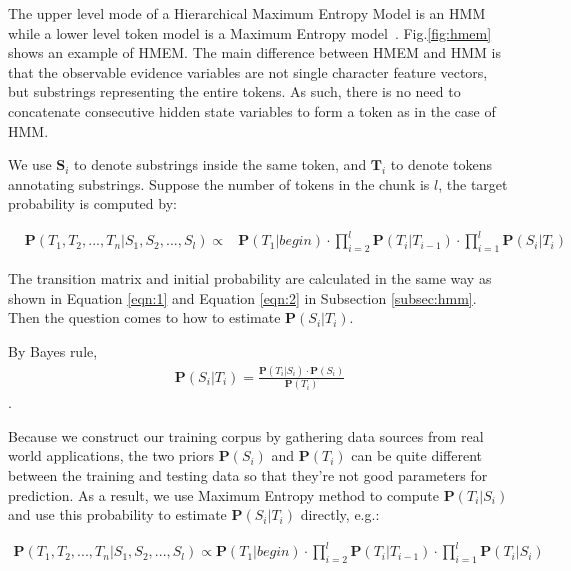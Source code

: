 The upper level mode of a Hierarchical Maximum Entropy Model 
is an HMM while a lower level token model 
is a Maximum Entropy model~\cite{Berger96:ME}\cite{megaweb}.
Fig.\ref{fig:hmem} shows an example of HMEM.
The main difference between HMEM and HMM is
that the observable evidence variables are not single character feature vectors, 
but substrings representing the entire tokens.
As such, there is no need to concatenate consecutive hidden state
variables to form a token as in the case of HMM.

We use $\mathbf{S}_i$ to denote substrings
inside the same token, and $\mathbf{T}_i$ to denote tokens annotating
substrings. Suppose the number of tokens in the chunk is $l$, the
target probability is computed by:

\begin{eqnarray*}
& \mathbf{P}(T_1, T_2, ..., T_n|S_1, S_2, ..., S_l)  \propto &
\mathbf{P}(T_1|begin) \cdot \prod_{i=2}^{l}{\mathbf{P}(T_i|T_{i-1})}
\cdot \prod_{i=1}^{l}\mathbf{P}(S_i|T_i)
\end{eqnarray*}

The transition matrix and initial probability are calculated in the
same way as shown in Equation \ref{eqn:1} and Equation \ref{eqn:2}
in Subsection \ref{subsec:hmm}. Then the question comes to how to
estimate $\mathbf{P}(S_i|T_i)$.

By Bayes rule,
\begin{eqnarray*}
\mathbf{P}(S_i|T_i) = \frac{\mathbf{P}(T_i|S_i) \cdot
\mathbf{P}(S_i)}{\mathbf{P}(T_i)}
\end{eqnarray*}.

Because we construct our training corpus by gathering data sources 
from real world applications, the two priors $\mathbf{P}(S_i)$ and
$\mathbf{P}(T_i)$ can be quite different between the training and
testing data so that they're not good parameters for prediction. As
a result, we use Maximum Entropy method to compute
$\mathbf{P}(T_i|S_i)$ and use this probability to estimate
$\mathbf{P}(S_i|T_i)$ directly, e.g.:

\begin{eqnarray*}
\mathbf{P}(T_1, T_2, ..., T_n|S_1, S_2, ..., S_l) \propto
\mathbf{P}(T_1|begin) \cdot \prod_{i=2}^{l}\mathbf{P}(T_i|T_{i-1})
\cdot \prod_{i=1}^{l}\mathbf{P}(T_i|S_i)
\end{eqnarray*}

